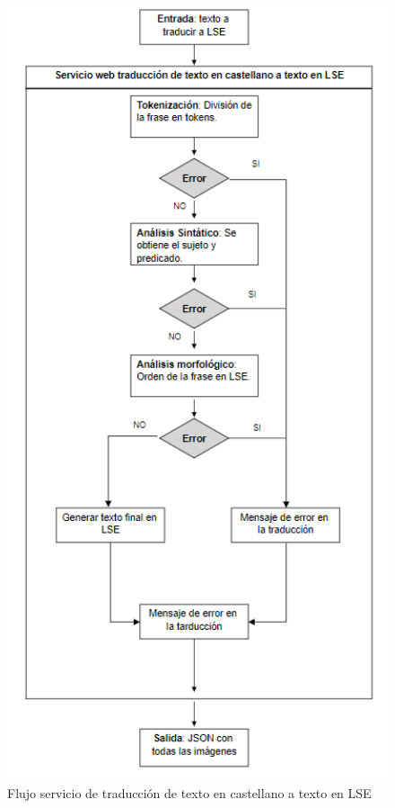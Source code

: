 \begin{figure}[]
	\centering
	\includegraphics[width=1\textwidth]{Imagenes/Fuentes/Text2LSE/textotextoLSE.png}
	\caption{ Flujo servicio de traducción de texto en castellano a texto en LSE }
	\label {fig: imgFlujoFlujoTextoLSE}
\end{figure}

